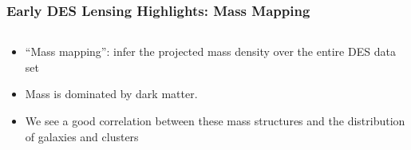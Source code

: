 \documentclass{beamer}
\begin{document}
\frame
{

    \frametitle{Early DES Lensing Highlights: Mass Mapping}

 
    \begin{columns}
        \begin{column}{0.4\textwidth}
            \begin{itemize}

                \item ``Mass mapping'': infer the projected mass density
                    over the entire DES data set
                
                \item Mass is dominated by dark matter.

                \item We see a good correlation between these mass structures
                    and the distribution of galaxies and clusters


\end{itemize}
\end{column}
\end{columns}}
\end{document}
